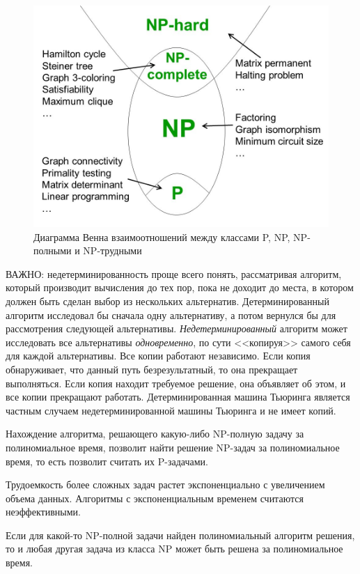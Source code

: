 \documentclass[%
	11pt,
	a4paper,
	utf8,
		]{article}
\begin{document}
\begin{figure}[h]
	\centering
	\includegraphics[scale=0.35]{figures/np.jpg}
	\caption{ Диаграмма Венна взаимоотношений между классами P, NP, NP-полными и NP-трудными }\label{fig:np}
\end{figure}

ВАЖНО: недетерминированность проще всего понять, рассматривая алгоритм, который производит вычисления до тех пор, пока не доходит до места, в котором должен быть сделан выбор из нескольких альтернатив. Детерминированный алгоритм исследовал бы сначала одну альтернативу, а потом вернулся бы для рассмотрения следующей альтернативы. \emph{Недетерминированный} алгоритм может исследовать все альтернативы \emph{одновременно}, по сути <<копируя>> самого себя для каждой альтернативы. Все копии работают независимо. Если копия обнаруживает, что данный путь безрезультатный, то она прекращает выполняться. Если копия находит требуемое решение, она объявляет об этом, и все копии прекращают работать. Детерминированная машина Тьюринга является частным случаем недетерминированной машины Тьюринга и не имеет копий.

Нахождение алгоритма, решающего какую-либо NP-полную задачу за полиномиальное время, позволит найти решение NP-задач за полиномиальное время, то есть позволит считать их P-задачами.

Трудоемкость более сложных задач растет экспоненциально с увеличением объема данных. Алгоритмы с экспоненциальным временем считаются неэффективными. 

Если для какой-то NP-полной задачи найден полиномиальный алгоритм решения, то и любая другая задача из класса NP может быть решена за полиномиальное время.
\end{document}
